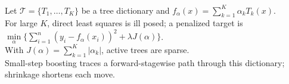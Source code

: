 \begin{remark} \label{rem:sl-stagewise-lasso-regularization-path} \\
Let $\mathcal T=\{T_1,\ldots,T_K\}$ be a tree dictionary and $f_\alpha(x)=\sum\limits_{k=1}^K\alpha_kT_k(x)$.\\
For large $K$, direct least squares is ill posed; a penalized target is $\min\limits_\alpha\{\sum\limits_{i=1}^n(y_i-f_\alpha(x_i))^2+\lambda J(\alpha)\}$.\\
With $J(\alpha)=\sum\limits_{k=1}^K|\alpha_k|$, active trees are sparse.\\
Small-step boosting traces a forward-stagewise path through this dictionary; shrinkage shortens each move.
\end{remark}

